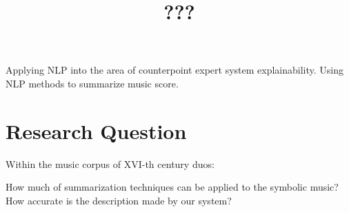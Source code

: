 \documentclass{article}
\title{???}
\begin{document}
Applying NLP into the area of counterpoint expert system explainability.
Using NLP methods to summarize music score.

\section{Research Question}

Within the music corpus of XVI-th century duos:

How much of summarization techniques can be applied to the symbolic music?
How accurate is the description made by our system?
\end{document}
